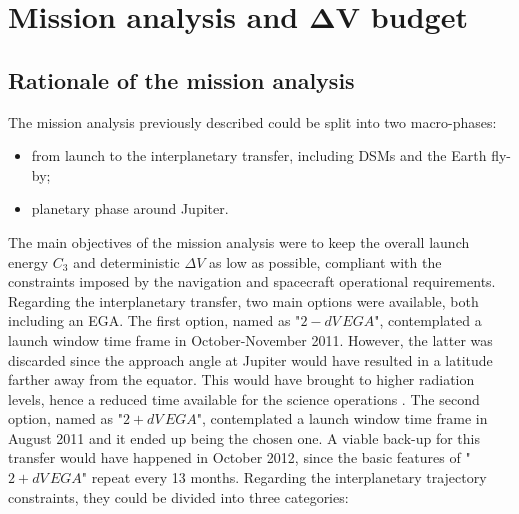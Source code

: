 \section
[\case{Mission analysis and \texorpdfstring{$\boldsymbol{\Delta V}$}{Delta-V} budget}
{Mission analysis and \texorpdfstring{$\Delta V$}{Delta-V} budget}]
{Mission analysis and \texorpdfstring{$\boldsymbol{\Delta V}$}{Delta-V} budget}
\label{sec:ma_and_dv}

\subsection{Rationale of the mission analysis}
\label{subsec:rationale_ma}

The mission analysis previously described could be split into two macro-phases:
\begin{itemize}
    \item from launch to the interplanetary transfer, including DSMs and the Earth fly-by;
    \item planetary phase around Jupiter.
\end{itemize}
The main objectives of the mission analysis were to keep the overall launch energy $C_3$ and deterministic $\Delta V$ as low as possible, compliant with the constraints imposed by the navigation and spacecraft operational requirements. Regarding the interplanetary transfer, two main options were available, both including an EGA. The first option, named as "$2- dV\,EGA$", contemplated a launch window time frame in October-November 2011. However, the latter was discarded since the approach angle at Jupiter would have resulted in a latitude farther away from the equator. This would have brought to higher radiation levels, hence a reduced time available for the science operations \cite{launch_period}. The second option, named as "$2+  dV\,EGA$", contemplated a launch window time frame in August 2011 and it ended up being the chosen one. A viable back-up for this transfer would have happened in October 2012, since the basic features of "$2+ dV\,EGA$" repeat every 13 months.
Regarding the interplanetary trajectory constraints, they could be divided into three categories:

